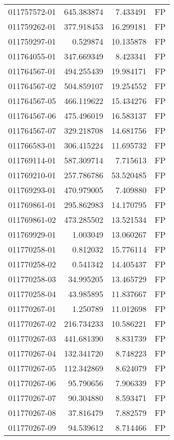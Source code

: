 \begin{tabular}{lrrl}
011757572-01 &  645.383874 &     7.433491 &   FP \\
011759262-01 &  377.918453 &    16.299181 &   FP \\
011759297-01 &    0.529874 &    10.135878 &   FP \\
011764055-01 &  347.669349 &     8.423341 &   FP \\
011764567-01 &  494.255439 &    19.984171 &   FP \\
011764567-02 &  504.859107 &    19.254552 &   FP \\
011764567-05 &  466.119622 &    15.434276 &   FP \\
011764567-06 &  475.496019 &    16.583137 &   FP \\
011764567-07 &  329.218708 &    14.681756 &   FP \\
011766583-01 &  306.415224 &    11.695732 &   FP \\
011769114-01 &  587.309714 &     7.715613 &   FP \\
011769210-01 &  257.786786 &    53.520485 &   FP \\
011769293-01 &  470.979005 &     7.409880 &   FP \\
011769861-01 &  295.862983 &    14.170795 &   FP \\
011769861-02 &  473.285502 &    13.521534 &   FP \\
011769929-01 &    1.003049 &    13.060267 &   FP \\
011770258-01 &    0.812032 &    15.776114 &   FP \\
011770258-02 &    0.541342 &    14.405437 &   FP \\
011770258-03 &   34.995205 &    13.465729 &   FP \\
011770258-04 &   43.985895 &    11.837667 &   FP \\
011770267-01 &    1.250789 &    11.012698 &   FP \\
011770267-02 &  216.734233 &    10.586221 &   FP \\
011770267-03 &  441.681390 &     8.831739 &   FP \\
011770267-04 &  132.341720 &     8.748223 &   FP \\
011770267-05 &  112.342869 &     8.624079 &   FP \\
011770267-06 &   95.790656 &     7.906339 &   FP \\
011770267-07 &   90.304880 &     8.593471 &   FP \\
011770267-08 &   37.816479 &     7.882579 &   FP \\
011770267-09 &   94.539612 &     8.714466 &   FP \\

\end{tabular}
